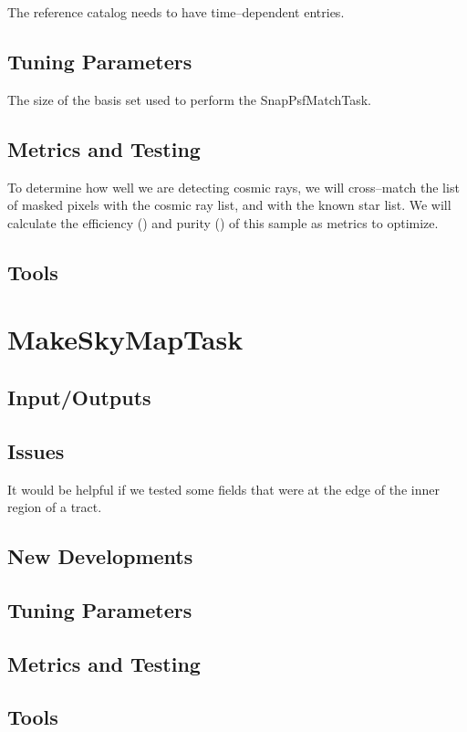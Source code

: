 \documentclass[12pt]{article}
\begin{document}
The reference catalog needs to have time--dependent entries.

\subsection{Tuning Parameters}

The size of the basis set used to perform the SnapPsfMatchTask.

\subsection{Metrics and Testing}

To determine how well we are detecting cosmic rays, we will
cross--match the list of masked pixels with the cosmic ray list, and
with the known star list.  We will calculate the efficiency () and
purity () of this sample as metrics to optimize.

\subsection{Tools}


\clearpage 
\section{MakeSkyMapTask} 

\subsection{Input/Outputs}
\subsection{Issues}
It would be helpful if we tested some fields that were at the edge of
the inner region of a tract.
\subsection{New Developments}
\subsection{Tuning Parameters}

\subsection{Metrics and Testing}
\subsection{Tools}
\end{document}
